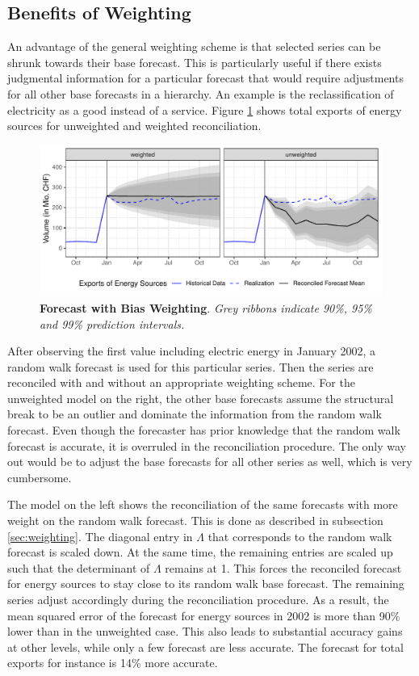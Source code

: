 \documentclass[a4paper,fleqn,11pt]{article}
\begin{document}
\subsection{Benefits of Weighting}\label{sec:resweight}
An advantage of the general weighting scheme is that selected series can be shrunk towards their base forecast. This is particularly useful if there exists judgmental information for a particular forecast that would require adjustments for all other base forecasts in a hierarchy. An example is the reclassification of electricity as a good instead of a service. Figure \ref{fig:fcex} shows total exports of energy sources for unweighted and weighted reconciliation.
\begin{figure}[H]
	\includegraphics[width=\textwidth]{fig/fig_electricity}
	\caption[Forecast with Bias Weighting]{\textbf{Forecast with Bias Weighting}. \textit{Grey ribbons indicate 90\%, 95\% and 99\% prediction intervals.}}\label{fig:fcex}
\end{figure}
After observing the first value including electric energy in January 2002, a random walk forecast is used for this particular series. Then the series are reconciled with and without an appropriate weighting scheme. For the unweighted model on the right, the other base forecasts assume the structural break to be an outlier and dominate the information from the random walk forecast. Even though the forecaster has prior knowledge that the random walk forecast is accurate, it is overruled in the reconciliation procedure. The only way out would be to adjust the base forecasts for all other series as well, which is very cumbersome.

The model on the left shows the reconciliation of the same forecasts with more weight on the random walk forecast. This is done as described in subsection \ref{sec:weighting}. The diagonal entry in $\Lambda$ that corresponds to the random walk forecast is scaled down. At the same time, the remaining entries are scaled up such that the determinant of $\Lambda$ remains at 1. This forces the reconciled forecast for energy sources to stay close to its random walk base forecast. The remaining series adjust accordingly during the reconciliation procedure. As a result, the mean squared error of the forecast for energy sources in 2002 is more than 90\% lower than in the unweighted case. This also leads to substantial accuracy gains at other levels, while only a few forecast are less accurate. The forecast for total exports for instance is 14\% more accurate.
\end{document}
